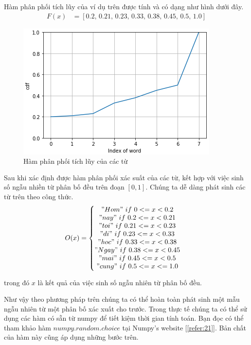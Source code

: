 Hàm phân phối tích lũy của ví dụ trên được tính và có dạng như hình dưới đây.
\begin{align*}
  F(x) &= [0.2, \, 0.21, \, 0.23, \, 0.33, \, 0.38, \, 0.45, \, 0.5, \, 1.0]
\end{align*}

\clearpage
\begin{figure}[h!]
	\centering
		\includegraphics[width=0.6\columnwidth]{books/artificial-neural-network/chapter07/figure-sec3/cdf.jpg}
		\centering
	\caption{Hàm phân phối tích lũy của các từ}
\end{figure}

Sau khi xác định được hàm phân phối xác suất của các từ, kết hợp với việc sinh số ngẫu nhiền từ phân bố đều trên đoạn $[0, 1]$. Chúng ta dễ dàng phát sinh các từ trên theo công thức.
\begin{align*}
  O(x) &= \left\{
                \begin{matrix}
                "Hom" \ if \ 0 <= x < 0.2\\
                "nay" \ if \ 0.2 <= x < 0.21\\
                "toi" \ if \ 0.21 <= x < 0.23\\
                "di" \ if \ 0.23 <= x < 0.33\\
                "hoc" \ if \ 0.33 <= x < 0.38\\
                "Ngay" \ if \ 0.38 <= x < 0.45\\
                "mai" \ if \ 0.45 <= x < 0.5\\
                "cung" \ if \ 0.5 <= x <= 1.0 \\
                \end{matrix}\right.
\end{align*}

trong đó $x$ là kết quả của việc sinh số ngẫu nhiên từ phân bố đều.

Như vậy theo phương pháp trên chúng ta có thể hoàn toàn phát sinh một mẫu ngẫu nhiên từ một phân bố xác xuất cho trước. Trong thực tế chúng ta có thể sử dụng các hàm có sẵn từ numpy để tiết kiệm thời gian tính toán. Bạn đọc có thể tham khảo hàm $numpy.random.choice$ tại Numpy's website [\ref{refer:21}]. Bản chất của hàm này cũng áp dụng những bước trên.


